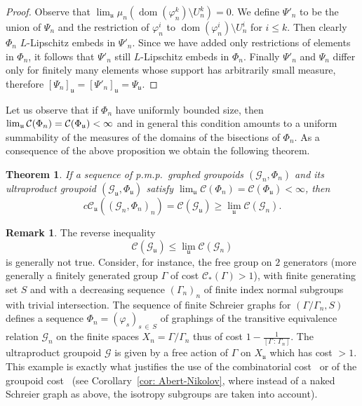\documentclass[10pt]{amsart}
\newtheorem{theo}[cdrthm]{Theorem}
\theoremstyle{definition}
\newtheorem{rema}[cdrthm]{Remark}
\newcommand{\cost}{\mathcal{C}}
\newcommand{\ccost}{c\mathcal{C}}
\newcommand{\cg}{\mathcal{G}}
\newcommand{\vraicost}{\mathscr{C}}
\DeclareMathOperator{\dom}{dom}
\newcommand{\ul}{\mathfrak{u}}
\newcommand{\ph}{\varphi}
\newcommand{\pmp}{p.m.p.\ }
\begin{document}
\begin{proof}
Observe that $\lim_\ul\mu_n(\dom(\ph^k_n)\setminus U^k_n)=0$. We define $\Psi'_n$ to be the union of $\Psi_n$ and the restriction of $\ph^i_n$ to $\dom(\ph^i_n)\setminus U_n^{i}$ for $i\leq k$. Then clearly $\Phi_n$ $L$-Lipschitz embeds in $\Psi'_n$. Since we have added only restrictions of elements in $\Phi_n$, it follows that $\Psi'_n$ still $L$-Lipschitz embeds in $\Phi_n$. Finally $\Psi'_n$ and $\Psi_n$ differ only for finitely many elements whose support has arbitrarily small measure, therefore $[\Psi_n]_\ul=[\Psi'_n]_\ul=\Psi_\ul$.
\end{proof}

Let us observe that if $\Phi_n$ have uniformly bounded size, then $\lim_\ul \cost(\Phi_n) = \cost(\Phi_\ul)\linebreak<\infty$ and in general this condition amounts to a uniform summability of the measures of the domains of the bisections of $\Phi_n$. As a consequence of the above proposition we obtain the following theorem.


\begin{theo}\label{thm:costccost}
If a sequence of \pmp graphed groupoids $(\cg_n,\Phi_n)$ and its ultraproduct groupoid $(\cg_\ul,\Phi_\ul)$ satisfy $\lim_\ul \cost(\Phi_n) = \cost(\Phi_\ul) <\infty$, then
\[
\ccost_\ul((\cg_n,\Phi_n)_n)=\cost(\cg_\ul)\geq\lim_{\ul}\cost(\cg_{n}).
\]
\end{theo}


\begin{rema}\label{rem: counterex revers ineq non-group}
The reverse inequality
\begin{equation}
\cost(\cg_\ul)\leq \lim_{\ul}\cost(\cg_{n})
\end{equation}
is generally not true. Consider, for instance, the free group on $2$ generators (more generally a finitely generated group $\Gamma$ of cost $\vraicost_{*}(\Gamma)>1$), with finite generating set $S$ and with a decreasing sequence $(\Gamma_n)_n$ of finite index normal subgroups with trivial intersection. The sequence of finite Schreier graphs for $(\Gamma/\Gamma_n, S)$ defines a sequence $\Phi_n=(\ph_s)_{s\,\in\,S}$ of graphings of the transitive equivalence relation $\cg_n$ on the finite spaces $X_n=\Gamma/\Gamma_n$ thus of cost $1-\tfrac{1}{[\Gamma\,:\,\Gamma_n]}$. The ultraproduct groupoid $\cg$ is given by a free action of $\Gamma$ on $X_\ul$ which has cost $>1$. This example is exactly what justifies the use of the combinatorial cost~\cite{Elek-combinatorial-cost-2007} or of the groupoid cost~\cite{Abert-Nikolov-12} (see Corollary~\ref{cor: Abert-Nikolov}, where instead of a naked Schreier graph as above, the isotropy subgroups are taken into account).
\end{rema}
\end{document}
